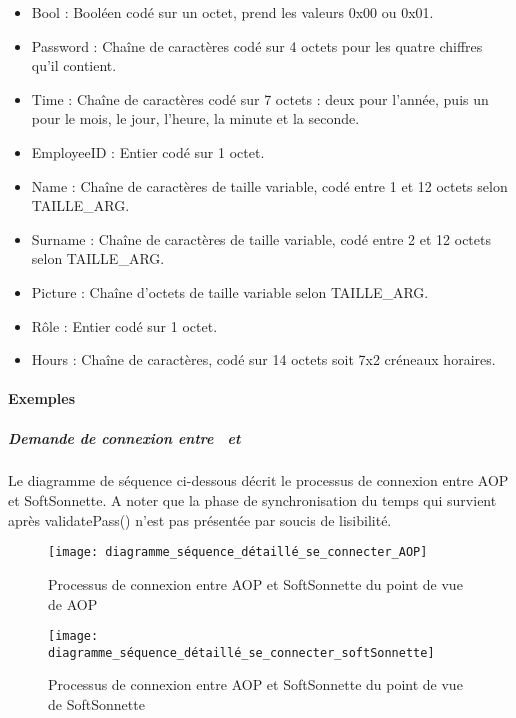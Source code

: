     \begin{itemize}
        \item {Bool : Booléen codé sur un octet, prend les valeurs 0x00 ou 0x01.}
        \item {Password : Chaîne de caractères codé sur 4 octets pour les quatre chiffres qu'il contient.}
        \item {Time : Chaîne de caractères codé sur 7 octets : deux pour l'année, puis un pour le mois, le jour, l'heure, la minute et la seconde.}
        \item {EmployeeID : Entier codé sur 1 octet.}
        \item {Name : Chaîne de caractères de taille variable, codé entre 1 et 12 octets selon TAILLE\_ARG.}
        \item {Surname : Chaîne de caractères de taille variable, codé entre 2 et 12 octets selon TAILLE\_ARG.}
        \item {Picture : Chaîne d'octets de taille variable selon TAILLE\_ARG.}
        \item {Rôle : Entier codé sur 1 octet.}
        \item {Hours : Chaîne de caractères, codé sur 14 octets soit 7x2 créneaux horaires.}
       
    \end{itemize} 

    \paragraph{Exemples}%

        \subparagraph{Demande de connexion entre \appliA~et \appliLin}
    
        Le diagramme de séquence ci-dessous décrit le processus de connexion entre AOP et SoftSonnette.
        A noter que la phase de synchronisation du temps qui survient après validatePass() n'est pas présentée par soucis de lisibilité.

        \begin{figure} [H]
            \centering
            \texttt{[image: diagramme\_séquence\_détaillé\_se\_connecter\_AOP]}
            \caption{Processus de connexion entre AOP et SoftSonnette du point de vue de AOP}
            \label{Sequ-seConnecter-AOP}
        \end{figure}

        \begin{figure} [H]
            \centering
            \texttt{[image: diagramme\_séquence\_détaillé\_se\_connecter\_softSonnette]}
            \caption{Processus de connexion entre AOP et SoftSonnette du point de vue de SoftSonnette}
            \label{Sequ-seConnecter-softSonnette}
        \end{figure}

